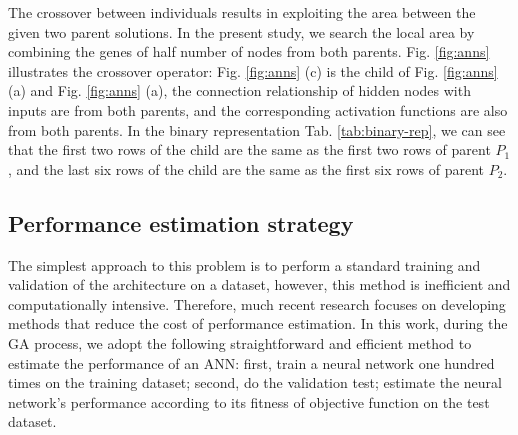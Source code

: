 The crossover between individuals results in exploiting the area between the
given two parent solutions. In the present study, we search the local area by
combining the genes of half number of nodes from both parents.
Fig. \ref{fig:anns} illustrates the crossover operator: Fig. \ref{fig:anns}
(c) is the child of Fig. \ref{fig:anns} (a) and Fig. \ref{fig:anns} (a), the
connection relationship of hidden nodes with inputs are from both parents,  and
the corresponding activation functions are also from both parents. In the
binary representation Tab. \ref{tab:binary-rep}, we can see that the first two
rows of the child are the same as the first two rows of parent $P_1$, and the
last six rows of the child are the same as the first six rows of parent $P_2$.

\subsection{Performance estimation strategy}
The simplest approach to this problem is to perform a standard training and
validation of the architecture on a dataset, however, this method is inefficient
and computationally intensive. Therefore, much recent
research\cite{baker2017accelerating} focuses on developing methods that reduce
the cost of performance estimation. In this work, during the GA process, we
adopt the following straightforward and efficient method to estimate the
performance of an ANN: first, train a neural network one hundred times on the
training dataset; second, do the validation test; estimate the neural network's
performance according to its fitness of objective function on the test dataset.  


